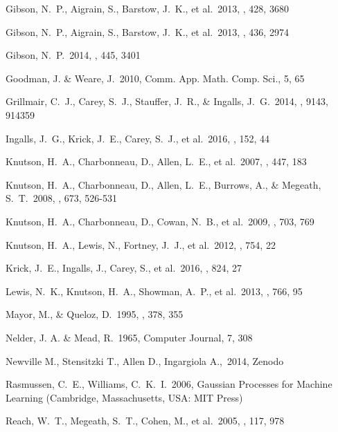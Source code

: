 \documentclass[twocolumn]{aastex61}
\begin{document}
\begin{thebibliography}{38}
 Gibson, N.~P., Aigrain, S., Barstow, J.~K., et al.\ 2013, \mnras, 428, 3680

 Gibson, N.~P., Aigrain, S., Barstow, J.~K., et al.\ 2013, \mnras, 436, 2974

 Gibson, N.~P.\ 2014, \mnras, 445, 3401

 Goodman, J. \& Weare, J.\ 2010, Comm. App. Math. Comp. Sci., 5, 65

 Grillmair, C.~J., Carey, S.~J., Stauffer, J.~R., \& Ingalls, J.~G.\ 2014, \procspie, 9143, 914359

 Ingalls, J.~G., Krick, J.~E., Carey, S.~J., et al.\ 2016, \aj, 152, 44

 Knutson, H.~A., Charbonneau, D., Allen, L.~E., et al.\ 2007, \nat, 447, 183

 Knutson, H.~A., Charbonneau, D., Allen, L.~E., Burrows, A., \& Megeath, S.~T.\ 2008, \apj, 673, 526-531

 Knutson, H.~A., Charbonneau, D., Cowan, N.~B., et al.\ 2009, \apj, 703, 769

 Knutson, H.~A., Lewis, N., Fortney, J.~J., et al.\ 2012, \apj, 754, 22

 Krick, J.~E., Ingalls, J., Carey, S., et al.\ 2016, \apj, 824, 27

 Lewis, N.~K., Knutson, H.~A., Showman, A.~P., et al.\ 2013, \apj, 766, 95

 Mayor, M., \& Queloz, D.\ 1995, \nat, 378, 355

 Nelder, J. A. \& Mead, R.\ 1965, Computer Journal, 7, 308

 Newville M., Stensitzki T., Allen D., Ingargiola A.,\ 2014, Zenodo

 Rasmussen, C.~E., Williams, C.~K.~I.\ 2006, Gaussian Processes for Machine Learning (Cambridge, Massachusetts, USA: MIT Press)

 Reach, W.~T., Megeath, S.~T., Cohen, M., et al.\ 2005, \pasp, 117, 978


\end{thebibliography}
\end{document}
